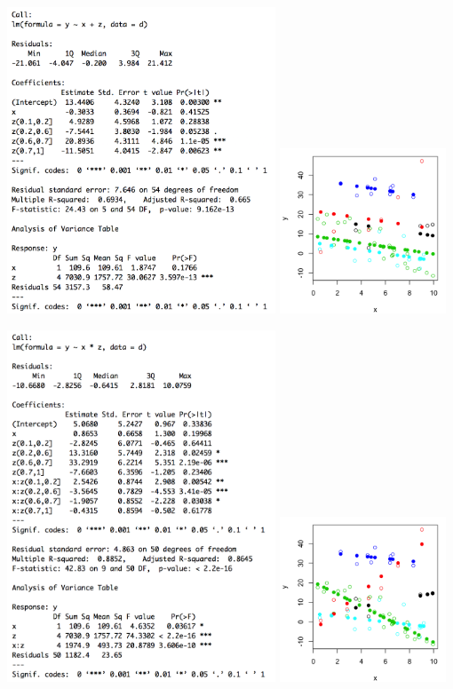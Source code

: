 \begin{center}
\includegraphics[width=0.6\textwidth]{img/model-2-output.png}
\includegraphics[width=0.37\textwidth]{img/model-2-predictions.png}
\end{center}

\begin{center}
\includegraphics[width=0.6\textwidth]{img/model-3-output.png}
\includegraphics[width=0.37\textwidth]{img/model-3-predictions.png}
\end{center}

